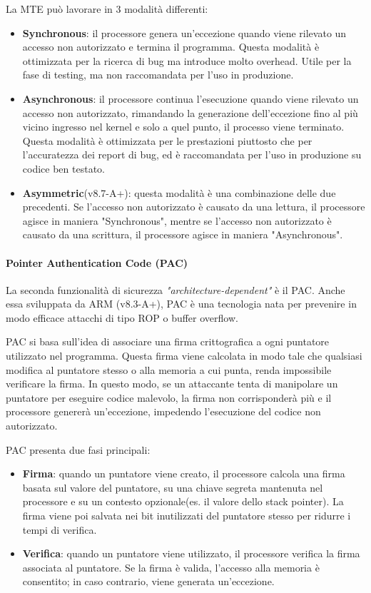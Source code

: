 La MTE può lavorare in 3 modalità differenti:
\begin{itemize}
  \item \textbf{Synchronous}: il processore genera un'eccezione quando viene rilevato
    un accesso non autorizzato e termina il programma. Questa modalità è
    ottimizzata per la ricerca di bug ma introduce molto overhead. Utile per la fase
    di testing, ma non raccomandata per l'uso in produzione.

  \item \textbf{Asynchronous}: il processore continua l'esecuzione quando viene rilevato
    un accesso non autorizzato, rimandando la generazione dell'eccezione fino al
    più vicino ingresso nel kernel e solo a quel punto, il processo viene terminato.
    Questa modalità è ottimizzata per le prestazioni piuttosto che per l'accuratezza
    dei report di bug, ed è raccomandata per l'uso in produzione su codice ben testato.

  \item \textbf{Asymmetric}(v8.7-A+): questa modalità è una combinazione delle
    due precedenti. Se l'accesso non autorizzato è causato da una lettura, il
    processore agisce in maniera "Synchronous", mentre se l'accesso non autorizzato
    è causato da una scrittura, il processore agisce in maniera "Asynchronous".
\end{itemize}

\paragraph{Pointer Authentication Code (PAC)}
La seconda funzionalità di sicurezza \textit{"architecture-dependent"} è il PAC.
Anche essa sviluppata da ARM (v8.3-A+), PAC è una tecnologia nata per prevenire in
modo efficace attacchi di tipo ROP o buffer overflow.

PAC si basa sull'idea di associare una firma crittografica a ogni puntatore utilizzato
nel programma. Questa firma viene calcolata in modo tale che qualsiasi modifica
al puntatore stesso o alla memoria a cui punta, renda impossibile verificare la firma.
In questo modo, se un attaccante tenta di manipolare un puntatore per eseguire codice
malevolo, la firma non corrisponderà più e il processore genererà un'eccezione, impedendo
l'esecuzione del codice non autorizzato.

PAC presenta due fasi principali:
\begin{itemize}
  \item \textbf{Firma}: quando un puntatore viene creato, il processore calcola
    una firma basata sul valore del puntatore, su una chiave segreta mantenuta nel
    processore e su un contesto opzionale(es. il valore dello stack pointer). La
    firma viene poi salvata nei bit inutilizzati del puntatore stesso per
    ridurre i tempi di verifica.

  \item \textbf{Verifica}: quando un puntatore viene utilizzato, il processore
    verifica la firma associata al puntatore. Se la firma è valida, l'accesso
    alla memoria è consentito; in caso contrario, viene generata un'eccezione.
\end{itemize}

